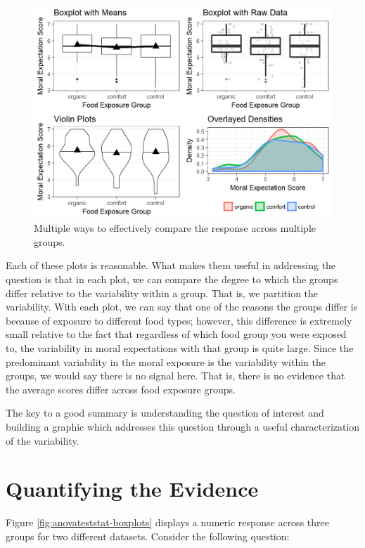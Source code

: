\documentclass[]{book}
\theoremstyle{definition}
\theoremstyle{definition}
\theoremstyle{definition}
\theoremstyle{remark}
\begin{document}
\begin{figure}

{\centering \includegraphics[width=0.8\linewidth]{./Images/anovasummaries-organic-comparison-1} 

}

\caption{Multiple ways to effectively compare the response across multiple groups.}\label{fig:anovasummaries-organic-comparison}
\end{figure}

Each of these plots is reasonable. What makes them useful in addressing
the question is that in each plot, we can compare the degree to which
the groups differ relative to the variability within a group. That is,
we partition the variability. With each plot, we can say that one of the
reasons the groups differ is because of exposure to different food
types; however, this difference is extremely small relative to the fact
that regardless of which food group you were exposed to, the variability
in moral expectations with that group is quite large. Since the
predominant variability in the moral exposure is the variability within
the groups, we would say there is no signal here. That is, there is no
evidence that the average scores differ across food exposure groups.

The key to a good summary is understanding the question of interest and
building a graphic which addresses this question through a useful
characterization of the variability.

\chapter{Quantifying the Evidence}\label{ANOVAteststat}

Figure \ref{fig:anovateststat-boxplots} displays a numeric response
across three groups for two different datasets. Consider the following
question:
\end{document}
